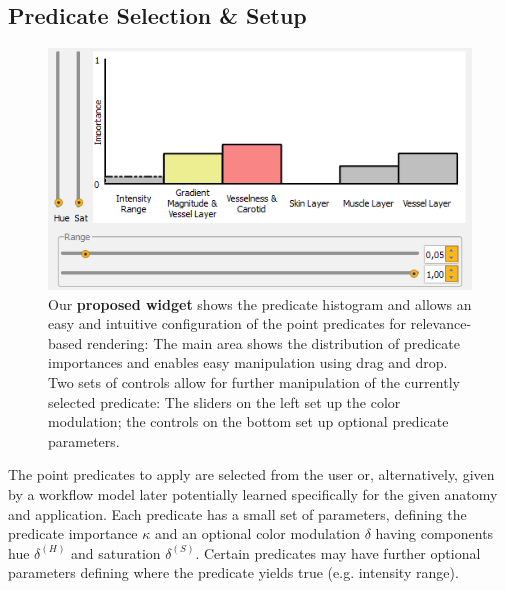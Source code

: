 \subsection{Predicate Selection \& Setup}
\begin{figure}[ht]
	\centering
	\includegraphics[width=0.75\linewidth]{figures/predicates/predicate_widget.png}
	\caption{Our \textbf{proposed widget} shows the predicate histogram and allows an easy and intuitive configuration of the point predicates for relevance-based rendering: The main area shows the distribution of predicate importances and enables easy manipulation using drag and drop. 
		Two sets of controls allow for further manipulation of the currently selected predicate: 
		The sliders on the left set up the color modulation; the controls on the bottom set up optional predicate parameters.}
	\label{fig:predicates:predicate_widget}
\end{figure}

The point predicates to apply are selected from the user or, alternatively, given by a workflow model later potentially learned specifically for the given anatomy and application. 
Each predicate has a small set of parameters, defining the predicate importance $\kappa$ and an optional color modulation $\delta$ having components hue $\delta^{(H)}$ and saturation $\delta^{(S)}$. 
Certain predicates may have further optional parameters defining where the predicate yields true (e.g. intensity range). 

